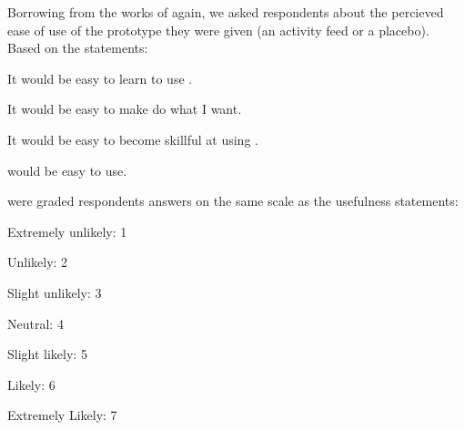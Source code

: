 \parabreak

Borrowing from the works of \citet{davis89} again,
we asked respondents about the percieved ease of use
of the prototype they were given (an activity feed or a placebo).
Based on the statements:
\begin{items}
  \item It would be easy to learn to use \latest{}.
  \item It would be easy to make \latest{} do what I want.
  \item It would be easy to become skillful at using \latest{}.
  \item \latest{} would be easy to use.
\end{items}

were graded respondents answers on the same scale as the usefulness
statements: 

\begin{items}
  \item Extremely unlikely: 1
  \item Unlikely: 2
  \item Slight unlikely: 3
  \item Neutral: 4
  \item Slight likely: 5
  \item Likely: 6
  \item Extremely Likely: 7
\end{items}


\parabreak


%

